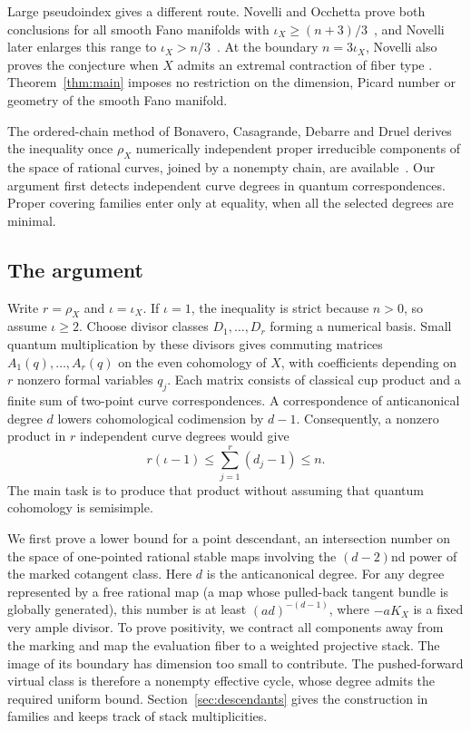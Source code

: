 Large pseudoindex gives a different route. Novelli and Occhetta
prove both conclusions for all smooth Fano manifolds with
$\iota_X\ge(n+3)/3$~\cite{NovelliOcchetta2010}, and Novelli later
enlarges this range to $\iota_X>n/3$~\cite[Theorem~5.1]{Novelli2012}.
At the boundary $n=3\iota_X$, Novelli also proves the conjecture
when $X$ admits an extremal contraction of fiber type
\cite{Novelli2026}. Theorem~\ref{thm:main}
imposes no restriction on the dimension, Picard number or geometry
of the smooth Fano manifold.

The ordered-chain method of Bonavero, Casagrande, Debarre and Druel
derives the inequality once $\rho_X$ numerically independent
proper irreducible components of the space of rational curves, joined
by a nonempty chain, are available~\cite[Corollary~5.3]{BCDD2003}.
Our argument first detects
independent curve degrees in quantum correspondences. Proper covering
families enter only at equality, when all the selected degrees are minimal.

\subsection*{The argument}

Write $r=\rho_X$ and $\iota=\iota_X$. If $\iota=1$, the inequality
is strict because $n>0$, so assume $\iota\ge2$.
Choose divisor classes $D_1,\ldots,D_r$ forming a numerical basis.
Small quantum multiplication by these divisors gives commuting
matrices $A_1(q),\ldots,A_r(q)$ on the even cohomology of $X$,
with coefficients depending on $r$ nonzero formal variables $q_j$.
Each matrix consists of classical cup product and a finite sum of
two-point curve correspondences. A correspondence of anticanonical
degree $d$ lowers cohomological codimension by $d-1$.
Consequently, a nonzero product in $r$ independent curve degrees would
give
\[
 r(\iota-1)\le\sum_{j=1}^r(d_j-1)\le n.
\]
The main task is to produce that product without assuming that quantum
cohomology is semisimple.

We first prove a lower bound for a point descendant, an intersection
number on the space of one-pointed rational stable maps involving the
$(d-2)$nd power of the marked cotangent class. Here $d$ is the
anticanonical degree. For any degree represented by a free rational map
(a map whose pulled-back tangent bundle is globally generated), this
number is at least $(ad)^{-(d-1)}$, where $-aK_X$
is a fixed very ample divisor. To prove positivity, we contract all
components away from the marking and map the evaluation fiber to a
weighted projective stack. The image of its boundary has dimension
too small to contribute. The pushed-forward virtual class is therefore
a nonempty effective cycle, whose degree admits the required uniform
bound. Section~\ref{sec:descendants} gives the construction in families
and keeps track of stack multiplicities.


